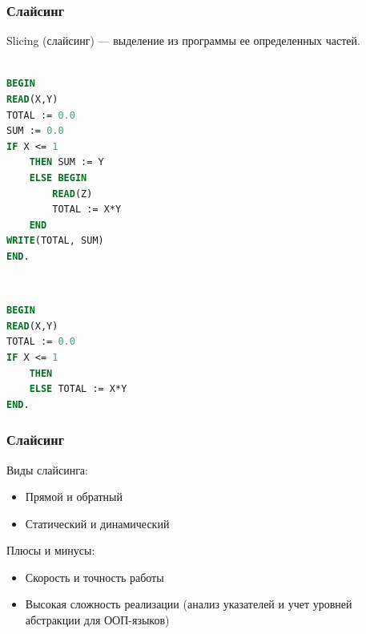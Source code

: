 
\begin{frame}[fragile]
	\frametitle{Слайсинг}
		Slicing (слайсинг) --- выделение из программы ее определенных частей. \\ \
	\small
	\begin{minipage}{0.4\linewidth}
	\begin{lstlisting}[language = pascal]
BEGIN
READ(X,Y)
TOTAL := 0.0
SUM := 0.0
IF X <= 1
    THEN SUM := Y
    ELSE BEGIN
        READ(Z)
        TOTAL := X*Y
    END
WRITE(TOTAL, SUM)
END.
\end{lstlisting}
	\end{minipage}
	\begin{minipage}{0.1\linewidth}
	\ \ 
	\end{minipage}
	\begin{minipage}{0.4\linewidth}
\begin{lstlisting}[language = pascal]
BEGIN
READ(X,Y)
TOTAL := 0.0
IF X <= 1
    THEN 
    ELSE TOTAL := X*Y
END.
\end{lstlisting}
	\end{minipage}
\end{frame}



\begin{frame}
	\frametitle{Слайсинг}
	Виды слайсинга:
	\begin{itemize}
		\item Прямой и обратный
		\item Статический и динамический
	\end{itemize}
	Плюсы и минусы:
	\begin{itemize}
		\item Скорость и точность работы
		\item Высокая сложность реализации (анализ указателей и учет уровней абстракции для ООП-языков)
	\end{itemize}
	
\end{frame}
	

